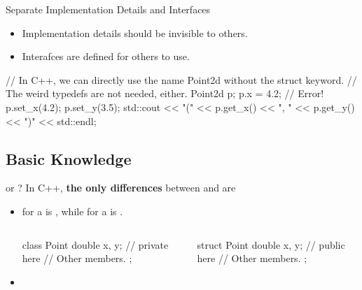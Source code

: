 \documentclass{beamer}
\begin{document}
\begin{frame}[fragile]{Separate Implementation Details and Interfaces}
    \begin{itemize}
        \item Implementation details should be invisible to others.
        \item Interafces are defined for others to use.
    \end{itemize}
    \begin{center}
        \begin{cpp}
// In C++, we can directly use the name Point2d without the struct keyword.
// The weird typedefs are not needed, either.
Point2d p;
p.x = 4.2;  // Error!
p.set_x(4.2);
p.set_y(3.5);
std::cout << "(" << p.get_x() << ", "
          << p.get_y() << ")" << std::endl;
        \end{cpp}    
    \end{center}
\end{frame}

\subsection{Basic Knowledge}

\begin{frame}[fragile]{\class or \struct?}
    In C++, \textbf{the only differences} between \class and \struct are
    \begin{itemize}
        \item {} for a \class is , while for a \struct is .
        \begin{columns}
            \begin{column}{0.5\linewidth}
                \begin{cpp}
class Point {
  double x, y; // private here
  // Other members.
};
                \end{cpp}
            \end{column}
            \begin{column}{0.5\linewidth}
                \begin{cpp}
struct Point {
  double x, y; // public here
  // Other members.
};
                \end{cpp}
            \end{column}
        \end{columns}
        \item {}
    \end{itemize}
\end{frame}
\end{document}

